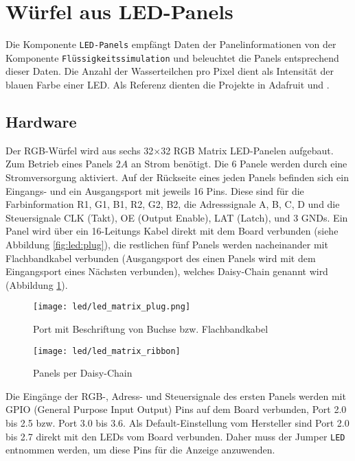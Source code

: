 \section{Würfel aus LED-Panels}
Die Komponente \texttt{LED-Panels} empfängt Daten der Panelinformationen von der Komponente \texttt{Flüssigkeitssimulation} und beleuchtet die Panels entsprechend dieser Daten. Die Anzahl der Wasserteilchen pro Pixel dient als Intensität der blauen Farbe einer LED. Als Referenz dienten die Projekte \cite{rgbLedMatrix} in Adafruit und \cite{rgbLedMatrixFpga}.

\subsection{Hardware}
Der RGB-Würfel wird aus sechs 32$\times$32 RGB Matrix LED-Panelen aufgebaut. Zum Betrieb eines Panels $2A$ an Strom benötigt. Die 6 Panele werden durch eine Stromversorgung aktiviert. Auf der Rückseite eines jeden Panels befinden sich ein Eingangs- und ein Ausgangsport mit jeweils 16 Pins. Diese sind für die Farbinformation R1, G1, B1, R2, G2, B2, die Adresssignale A, B, C, D und die Steuersignale CLK (Takt), OE (Output Enable), LAT (Latch), und 3 GNDs. Ein Panel wird über ein 16-Leitungs Kabel direkt mit dem Board verbunden (siehe Abbildung \ref{fig:led:plug}), die restlichen fünf Panels werden nacheinander mit Flachbandkabel verbunden (Ausgangsport des einen Panels wird mit dem Eingangsport eines Nächsten verbunden), welches Daisy-Chain genannt wird (Abbildung \ref{fig:led:chain}). 

\begin{figure}[h!]
	\centering
	\begin{minipage}[t]{0.45\linewidth}
	\texttt{[image: led/led\_matrix\_plug.png]}
	\caption{Port mit Beschriftung von Buchse bzw. Flachbandkabel}
	\label{fig:led:plug}
	\end{minipage}
	\hspace{0.05\linewidth}
	\begin{minipage}[t]{0.45\linewidth}
	\texttt{[image: led/led\_matrix\_ribbon]}
	\caption{Panels per Daisy-Chain}
	\label{fig:led:chain}
	\end{minipage}
\end{figure}

Die Eingänge der RGB-, Adress- und Steuersignale des ersten Panels werden mit GPIO (General Purpose Input Output) Pins auf dem Board verbunden, Port 2.0 bis 2.5 bzw. Port 3.0 bis 3.6. Als Default-Einstellung vom Hersteller sind Port 2.0 bis 2.7 direkt mit den LEDs vom Board verbunden. Daher muss der Jumper \texttt{LED} entnommen werden, um diese Pins für die Anzeige anzuwenden. %

